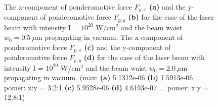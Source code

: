 \begin{figure}[h!]
	\centering
	\\
	\caption{The x-component of ponderomotive force $ F_{p, x} $ \textbf{(a)} and the y-component of ponderomotive force $ F_{p, y} $ \textbf{(b)} for the case of the laser beam with intensity I = $ 10^{20} $ W/cm$^2$ and the beam waist $ w_0 = 0.5 \ \mu\mathrm{m} $ propagating in vacuum. The x-component of ponderomotive force $ F_{p, x} $ \textbf{(c)} and the y-component of ponderomotive force $ F_{p, y} $ \textbf{(d)} for the case of the laser beam with intensity I = $ 10^{20} $ W/cm$^2$ and the beam waist $ w_0 = 2.0 \ \mu\mathrm{m} $ propagating in vacuum. (max: \textbf{(a)} 5.1312e-06 \textbf{(b)} 1.5913e-06 ... pomer: x:y = 3.2:1 \textbf{(c)} 5.9528e-06 \textbf{(d)} 4.6193e-07 ... pomer: x:y = 12.8:1)}
	\label{fig:21}
\end{figure}

